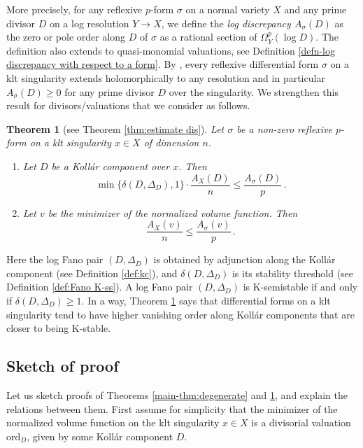\documentclass[12pt]{amsart}
\newtheorem{thm}[prop]{Theorem}
\theoremstyle{definition}
\newcommand{\ord}{\mathrm{ord}}
\numberwithin{equation}{section}
\begin{document}

More precisely, for any reflexive $p$-form $\sigma$ on a normal variety $X$ and any prime divisor $D$ on a log resolution $Y\to X$, we define the \emph{log discrepancy $A_\sigma (D)$} as the zero or pole order along $D$ of $\sigma$ as a rational section of $\Omega^p_Y(\log D)$. The definition also extends to quasi-monomial valuations, see Definition \ref{defn-log discrepancy with respect to a form}. By \cite{GKKP-extend-forms,KS-extend-forms}, every reflexive differential form $\sigma$ on a klt singularity extends holomorphically to any resolution and in particular $A_\sigma (D)\ge 0$ for any prime divisor $D$ over the singularity. We strengthen this result for divisors/valuations that we consider as follows.

\begin{thm}[see Theorem \ref{thm:estimate dis}] \label{main-thm:estimate dis}
Let $\sigma$ be a non-zero reflexive $p$-form on a klt singularity $x\in X$ of dimension $n$.
\begin{enumerate}
\item Let $D$ be a Koll\'ar component over $x$. Then
\[
\min\{\delta(D,\Delta_D),1\} \cdot \frac{A_X(D)}{n}\le \frac{A_{\sigma}(D)}{p} \, .
\]
\item Let $v$ be the minimizer of the normalized volume function. Then 
\[
\frac{A_X(v)}{n}\le \frac{A_{\sigma}(v)}{p} \, .
\]
\end{enumerate}
\end{thm}

Here the log Fano pair $(D,\Delta_D)$ is obtained by adjunction along the Koll\'ar component (see Definition \ref{def:kc}), and $\delta(D,\Delta_D)$ is its stability threshold (see Definition \ref{def:Fano K-ss}). A log Fano pair $(D,\Delta_D)$ is K-semistable if and only if $\delta(D,\Delta_D)\ge 1$. In a way, Theorem \ref{main-thm:estimate dis} says that differential forms on a klt singularity tend to have higher vanishing order along Koll\'ar components that are closer to being K-stable.

\subsection*{Sketch of proof}

Let us sketch proofs of Theorems \ref{main-thm:degenerate} and \ref{main-thm:estimate dis}, and explain the relations between them. First assume for simplicity that the minimizer of the normalized volume function on the klt singularity $x\in X$ is a divisorial valuation $\ord_D$, given by some Koll\'ar component $D$.
\end{document}
